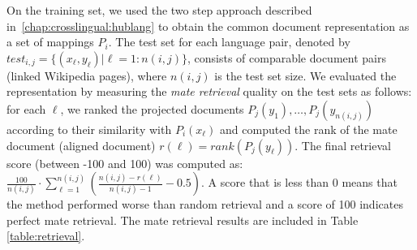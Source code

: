 On the training set, we used the two step approach described in~\ref{chap:crosslingual:hublang} 
to obtain the common document representation as a set of mappings $P_i$. 
The test set for each language pair, denoted by $test_{i,j} = \{(x_\ell,y_\ell) | \ell = 1:n(i,j)\} $, 
consists of comparable document pairs (linked Wikipedia pages), where $n(i,j)$ is the test set size. 
We evaluated the representation by measuring the \emph{mate retrieval} quality on the test sets as follows: 
for each $\ell$, we ranked the projected documents $P_j(y_1),\ldots, P_j(y_{n(i,j)})$ according to 
their similarity with $P_i(x_\ell)$ and computed the rank of the mate document (aligned document) 
$r(\ell) = rank(P_j(y_\ell))$. 
The final retrieval score (between -100 and 100) was computed as: 
$\frac{100}{n(i,j)} \cdot \sum_{\ell = 1}^{n(i,j)} \left( \frac{n(i,j) - r(\ell)}{n(i,j) -1} -0.5\right)$. 
A score that is less than 0 means that the method performed worse than random retrieval and a score of 100 
indicates perfect mate retrieval. The mate retrieval results are included in Table \ref{table:retrieval}.

